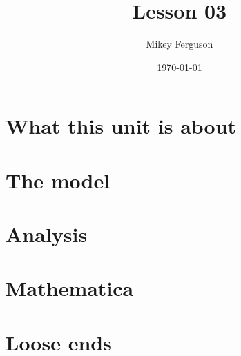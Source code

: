 \documentclass[11pt]{article}
\title{Lesson 03}
\author{Mikey Ferguson}
\date{\today}
\begin{document}
\maketitle
\tableofcontents
\bigskip

\section{What this unit is about}

\section{The model}

\section{Analysis}

\section{Mathematica}

\section{Loose ends}
\end{document}
